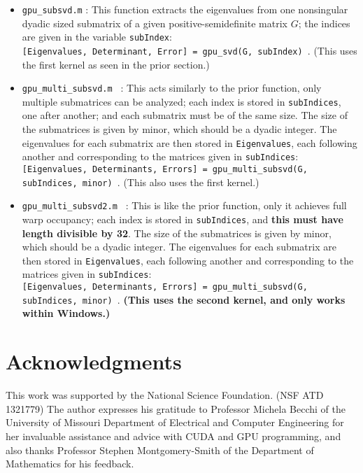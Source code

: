 \documentclass{amsart}
\begin{document}
\begin{itemize}
\item {\tt gpu\_subsvd.m} :  This function extracts the eigenvalues from one nonsingular dyadic sized submatrix of a given positive-semidefinite matrix $G$;  the indices are given in the variable {\tt subIndex}:  \\  {\tt [Eigenvalues, Determinant, Error] = gpu\_svd(G, subIndex) }.  (This uses the first kernel as seen in the prior section.)
\item {\tt gpu\_multi\_subsvd.m }  :  This acts similarly to the prior function, only multiple submatrices can be analyzed;  each index is stored in {\tt subIndices}, one after another;  and each submatrix must be of the same size.  The size of the submatrices is given by minor, which should be a dyadic integer.  The eigenvalues for each submatrix are then stored in {\tt Eigenvalues}, each following another and corresponding to the matrices given in {\tt subIndices}: \\
{\tt [Eigenvalues, Determinants, Errors] = gpu\_multi\_subsvd(G, subIndices, minor) }.  (This also uses the first kernel.)
\item {\tt gpu\_multi\_subsvd2.m }  :  This is like the prior function, only it achieves full warp occupancy;  each index is stored in {\tt subIndices}, and \textbf{this must have length divisible by 32}.  The size of the submatrices is given by minor, which should be a dyadic integer.  The eigenvalues for each submatrix are then stored in {\tt Eigenvalues}, each following another and corresponding to the matrices given in {\tt subIndices}: \\
{\tt [Eigenvalues, Determinants, Errors] = gpu\_multi\_subsvd(G, subIndices, minor) }.  \textbf{(This uses the second kernel, and only works within Windows.)}

\end{itemize}


\section*{Acknowledgments}

\noindent
This work was supported by the National Science Foundation.  (NSF ATD 1321779)  The author expresses his gratitude to Professor Michela Becchi of the University of Missouri Department of Electrical and Computer Engineering for her invaluable assistance and advice with CUDA and GPU programming, and also thanks Professor Stephen Montgomery-Smith of the Department of Mathematics for his feedback.

\end{document}
